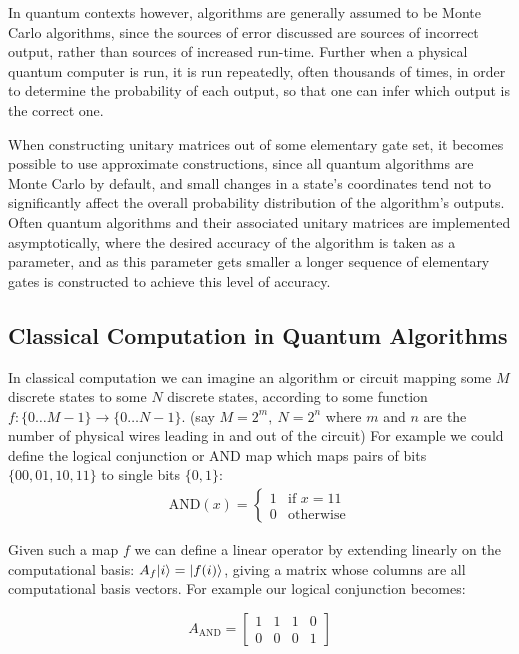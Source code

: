 In quantum contexts however, algorithms are generally assumed to be Monte Carlo algorithms, since the sources of error discussed are sources of incorrect output, rather than sources of increased run-time. Further when a physical quantum computer is run, it is run repeatedly, often thousands of times, in order to determine the probability of each output, so that one can infer which output is the correct one.

When constructing unitary matrices out of some elementary gate set, it becomes possible to use approximate constructions, since all quantum algorithms are Monte Carlo by default, and small changes in a state's coordinates tend not to significantly affect the overall probability distribution of the algorithm's outputs. Often quantum algorithms and their associated unitary matrices are implemented asymptotically, where the desired accuracy of the algorithm is taken as a parameter, and as this parameter gets smaller a longer sequence of elementary gates is constructed to achieve this level of accuracy.

\subsection{Classical Computation in Quantum Algorithms}

In classical computation we can imagine an algorithm or circuit mapping some $M$ discrete states to some $N$ discrete states, according to some function $f: \{0\dots M-1\} \to \{0\dots N-1\}$. (say $M = 2^m,\ N = 2^n$ where $m$ and $n$ are the number of physical wires leading in and out of the circuit) For example we could define the logical conjunction or AND map which maps pairs of bits $\{00, 01, 10, 11\}$ to single bits $\{0, 1\}$: 
\begin{align*}
\text{AND}(x) = \begin{cases}
1 & \text{if\ } x = 11\\
0 & \text{otherwise}
\end{cases}
\end{align*}

Given such a map $f$ we can define a linear operator by extending linearly on the computational basis: $A_f| i \rangle = | f(i) \rangle$, giving a matrix whose columns are all computational basis vectors. For example our logical conjunction becomes:

\[
A_\text{AND} = \left[\begin{matrix}
1&1&1&0\\
0&0&0&1
\end{matrix}\right]
\]

